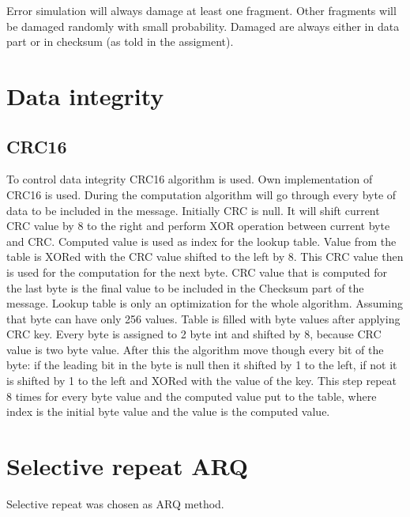 \documentclass{article}
\begin{document}
Error simulation will always damage at least one fragment. Other fragments will be damaged randomly with small probability. Damaged are always either in data part or in checksum (as told in the assigment).

\newpage

\section{Data integrity}


\subsection{CRC16}

To control data integrity CRC16 algorithm is used. 
Own implementation of CRC16 is used.
During the computation algorithm will go  through every byte of data to be included in the message. Initially CRC is null. It will shift current CRC value by 8 to the right and perform XOR operation between current byte and CRC. Computed value is used as index for the lookup table. Value from the table is XORed with the CRC value shifted to the left by 8. This CRC value then is used for the computation for the next byte. CRC value that is computed for the last byte is the final value to be included in the Checksum part of the message. \newline
Lookup table is only an optimization for the whole algorithm. Assuming that byte can have only 256 values.
Table is filled with byte values after applying CRC key. Every byte is assigned to 2 byte int and shifted by 8, because CRC value is two byte value. After this the algorithm move though every bit of the byte: if the leading bit in the byte is null then it shifted by 1 to the left, if not it is shifted by 1 to the left and XORed with the value of the key. This step repeat 8 times for every byte value and the computed value put to the table, where index is the initial byte value and the value is the computed value.


\section{Selective repeat ARQ}
Selective repeat was chosen as ARQ method. 
\end{document}
